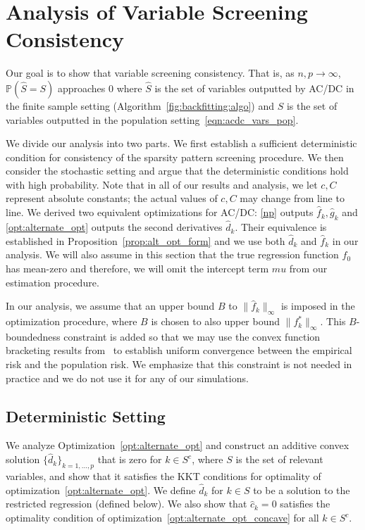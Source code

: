 \section{Analysis of Variable Screening Consistency}
\label{sec:finitesample}

Our goal is to show that variable screening consistency. That is, as $n,p \rightarrow \infty$, $\mathbb{P}( \hat{S} = S)$ approaches 0 where $\hat{S}$ is the set of variables outputted by AC/DC in the finite sample setting (Algorithm~\ref{fig:backfitting:algo}) and $S$ is the set of variables outputted in the population setting~\eqref{eqn:acdc_vars_pop}.

We divide our analysis into two parts. We first establish a sufficient
deterministic condition for consistency of the sparsity pattern
screening procedure.  We then consider the stochastic setting and argue that the 
deterministic conditions hold with high probability. Note that in all of our results 
and analysis, we let $c,
C$ represent absolute constants; the actual values of $c,C$ may change from line to line. We derived two equivalent optimizations for AC/DC: \eqref{np} outputs $\hat{f}_k, \hat{g}_k$ and \eqref{opt:alternate_opt} outputs the second derivatives $\hat{d}_k$. Their equivalence is established in Proposition~\ref{prop:alt_opt_form} and we use both $\hat{d}_k$ and $\hat{f}_k$ in our analysis. We will also assume in this section that the true regression function $f_0$ has mean-zero and therefore, we will omit the intercept term $\hat{mu}$ from our estimation procedure.

In our analysis, we assume that an upper bound $B$ to $\| \hat{f}_k \|_\infty$ 
is imposed in the optimization procedure, where $B$ is chosen to also upper bound $\| f^*_k \|_\infty$. This $B$-boundedness constraint is added so that we may use the convex function bracketing results from~\cite{kim2014global} to establish uniform convergence between the empirical risk and the population risk. We emphasize that this constraint is not needed in practice and we do not use it for any of our simulations. 


\subsection{Deterministic Setting}

We analyze Optimization~\ref{opt:alternate_opt} and construct an additive convex solution $\{\hat{d}_k\}_{k=1,\ldots,p}$
that is zero for $k \in S^c$, where $S$ is the set of relevant
variables, and show that it satisfies the KKT
conditions for optimality of optimization~\eqref{opt:alternate_opt}. We
define $\hat{d}_k$ for $k \in S$ to be a solution to the restricted
regression (defined below). We also show that $\hat{c}_k =
0$ satisfies the optimality condition of
optimization~\eqref{opt:alternate_opt_concave} for all $k \in S^c$.

